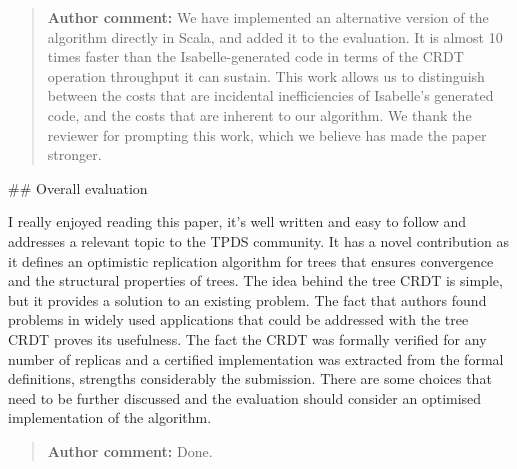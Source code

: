 \documentclass[10pt]{article}
\newcommand{\authorcomment}[1]{\begin{quote}\textbf{Author comment:} #1\end{quote}}
\begin{document}
\authorcomment{We have implemented an alternative version of the algorithm directly in Scala, and added it to the evaluation.
It is almost 10 times faster than the Isabelle-generated code in terms of the CRDT operation throughput it can sustain.
This work allows us to distinguish between the costs that are incidental inefficiencies of Isabelle's generated code, and the costs that are inherent to our algorithm.
We thank the reviewer for prompting this work, which we believe has made the paper stronger.}
\begin{spverbatim}

## Overall evaluation

I really enjoyed reading this paper, it's well written and easy to follow and addresses a relevant topic to the TPDS community.
It has a novel contribution as it defines an optimistic replication algorithm for trees that ensures convergence and the structural properties of trees. The idea behind the tree CRDT is simple, but it provides a solution to an existing problem. The fact that authors found problems in widely used applications that could be addressed with the tree CRDT proves its usefulness.
The fact the CRDT was formally verified for any number of replicas and a certified implementation was extracted from the formal definitions, strengths considerably the submission.
There are some choices that need to be further discussed and the evaluation should consider an optimised implementation of the algorithm.
\end{spverbatim}
\authorcomment{Done.}
\end{document}
